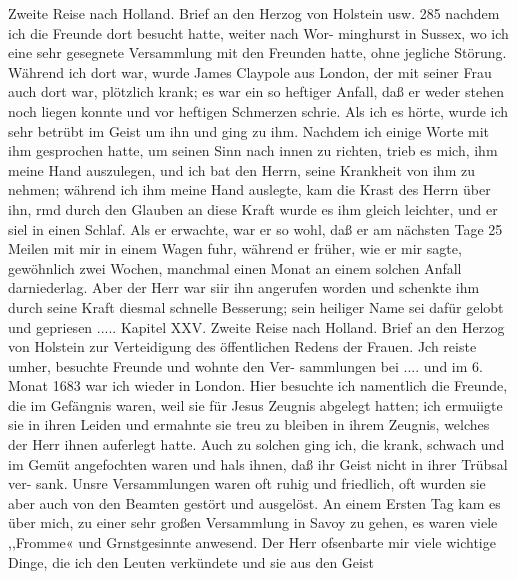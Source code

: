 Zweite Reise nach Holland. Brief an den Herzog von Holstein usw. 285
nachdem ich die Freunde dort besucht hatte, weiter nach Wor-
minghurst in Sussex, wo ich eine sehr gesegnete Versammlung
mit den Freunden hatte, ohne jegliche Störung. Während ich
dort war, wurde James Claypole aus London, der mit seiner
Frau auch dort war, plötzlich krank; es war ein so heftiger Anfall,
daß er weder stehen noch liegen konnte und vor heftigen Schmerzen
schrie. Als ich es hörte, wurde ich sehr betrübt im Geist um ihn
und ging zu ihm. Nachdem ich einige Worte mit ihm gesprochen
hatte, um seinen Sinn nach innen zu richten, trieb es mich, ihm
meine Hand auszulegen, und ich bat den Herrn, seine Krankheit
von ihm zu nehmen; während ich ihm meine Hand auslegte, kam
die Krast des Herrn über ihn, rmd durch den Glauben an diese
Kraft wurde es ihm gleich leichter, und er siel in einen Schlaf.
Als er erwachte, war er so wohl, daß er am nächsten Tage
25 Meilen mit mir in einem Wagen fuhr, während er früher,
wie er mir sagte, gewöhnlich zwei Wochen, manchmal einen
Monat an einem solchen Anfall darniederlag. Aber der Herr
war siir ihn angerufen worden und schenkte ihm durch seine Kraft
diesmal schnelle Besserung; sein heiliger Name sei dafür gelobt
und gepriesen .....
Kapitel XXV.
Zweite Reise nach Holland. Brief an den Herzog von Holstein
zur Verteidigung des öffentlichen Redens der Frauen.
Jch reiste umher, besuchte Freunde und wohnte den Ver-
sammlungen bei .... und im 6. Monat 1683 war ich wieder
in London. Hier besuchte ich namentlich die Freunde, die im
Gefängnis waren, weil sie für Jesus Zeugnis abgelegt hatten;
ich ermuiigte sie in ihren Leiden und ermahnte sie treu zu bleiben
in ihrem Zeugnis, welches der Herr ihnen auferlegt hatte. Auch
zu solchen ging ich, die krank, schwach und im Gemüt angefochten
waren und hals ihnen, daß ihr Geist nicht in ihrer Trübsal ver-
sank. Unsre Versammlungen waren oft ruhig und friedlich, oft
wurden sie aber auch von den Beamten gestört und ausgelöst.
An einem Ersten Tag kam es über mich, zu einer sehr großen
Versammlung in Savoy zu gehen, es waren viele ,,Fromme« und
Grnstgesinnte anwesend. Der Herr ofsenbarte mir viele wichtige
Dinge, die ich den Leuten verkündete und sie aus den Geist


